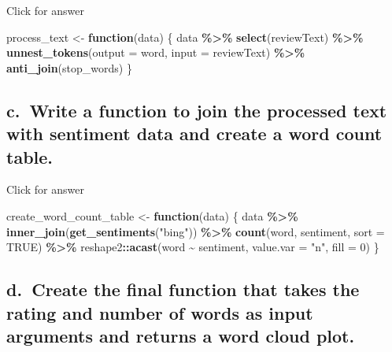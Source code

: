 \documentclass[
]{book}
\newenvironment{Shaded}{\begin{snugshade}}{\end{snugshade}}
\newcommand{\AttributeTok}[1]{\textcolor[rgb]{0.13,0.29,0.53}{#1}}
\newcommand{\ConstantTok}[1]{\textcolor[rgb]{0.56,0.35,0.01}{#1}}
\newcommand{\ControlFlowTok}[1]{\textcolor[rgb]{0.13,0.29,0.53}{\textbf{#1}}}
\newcommand{\DecValTok}[1]{\textcolor[rgb]{0.00,0.00,0.81}{#1}}
\newcommand{\FunctionTok}[1]{\textcolor[rgb]{0.13,0.29,0.53}{\textbf{#1}}}
\newcommand{\NormalTok}[1]{#1}
\newcommand{\OtherTok}[1]{\textcolor[rgb]{0.56,0.35,0.01}{#1}}
\newcommand{\SpecialCharTok}[1]{\textcolor[rgb]{0.81,0.36,0.00}{\textbf{#1}}}
\newcommand{\StringTok}[1]{\textcolor[rgb]{0.31,0.60,0.02}{#1}}
\begin{document}
Click for answer

\begin{Shaded}
\begin{Highlighting}[]
\NormalTok{process\_text }\OtherTok{\textless{}{-}} \ControlFlowTok{function}\NormalTok{(data) \{}
\NormalTok{  data }\SpecialCharTok{\%\textgreater{}\%}
    \FunctionTok{select}\NormalTok{(reviewText) }\SpecialCharTok{\%\textgreater{}\%}
    \FunctionTok{unnest\_tokens}\NormalTok{(}\AttributeTok{output =}\NormalTok{ word, }\AttributeTok{input =}\NormalTok{ reviewText) }\SpecialCharTok{\%\textgreater{}\%}
    \FunctionTok{anti\_join}\NormalTok{(stop\_words)}
\NormalTok{\}}
\end{Highlighting}
\end{Shaded}

\hypertarget{c.-write-a-function-to-join-the-processed-text-with-sentiment-data-and-create-a-word-count-table.}{%
\subsection{c.~Write a function to join the processed text with sentiment data and create a word count table.}\label{c.-write-a-function-to-join-the-processed-text-with-sentiment-data-and-create-a-word-count-table.}}

Click for answer

\begin{Shaded}
\begin{Highlighting}[]
\NormalTok{create\_word\_count\_table }\OtherTok{\textless{}{-}} \ControlFlowTok{function}\NormalTok{(data) \{}
\NormalTok{  data }\SpecialCharTok{\%\textgreater{}\%}
    \FunctionTok{inner\_join}\NormalTok{(}\FunctionTok{get\_sentiments}\NormalTok{(}\StringTok{"bing"}\NormalTok{)) }\SpecialCharTok{\%\textgreater{}\%}
    \FunctionTok{count}\NormalTok{(word, sentiment, }\AttributeTok{sort =} \ConstantTok{TRUE}\NormalTok{) }\SpecialCharTok{\%\textgreater{}\%}
\NormalTok{    reshape2}\SpecialCharTok{::}\FunctionTok{acast}\NormalTok{(word }\SpecialCharTok{\textasciitilde{}}\NormalTok{ sentiment, }\AttributeTok{value.var =} \StringTok{"n"}\NormalTok{, }\AttributeTok{fill =} \DecValTok{0}\NormalTok{)}
\NormalTok{\}}
\end{Highlighting}
\end{Shaded}

\hypertarget{d.-create-the-final-function-that-takes-the-rating-and-number-of-words-as-input-arguments-and-returns-a-word-cloud-plot.}{%
\subsection{d.~Create the final function that takes the rating and number of words as input arguments and returns a word cloud plot.}\label{d.-create-the-final-function-that-takes-the-rating-and-number-of-words-as-input-arguments-and-returns-a-word-cloud-plot.}}
\end{document}
